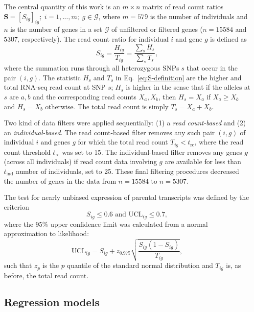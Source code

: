 \documentclass[letterpaper]{article}
\begin{document}
The central quantity of this work is an \(m\times n\) matrix of read count ratios
\(\mathbf{S} = [S_{ig}]_{ig};\; i=1,...,m; \; g\in\mathcal{G}\), where
\(m=579\) is the number of individuals and \(n\) is the number of genes
in a set \(\mathcal{G}\) of unfiltered or filtered genes (\(n=15584\) and \(5307\),
respectively).  The read count ratio for
individual \(i\) and gene \(g\) is defined as
\begin{equation}
S_{ig} = \frac{H_{ig}}{T_{ig}}= \frac{\sum_s H_s}{\sum_sT_s},
\label{eq:S-definition}
\end{equation}
where the summation runs through all heterozygous SNPs \(s\) that occur in the
pair
\((i,g)\).  The statistic \(H_s\) and \(T_s\) in Eq.~\ref{eq:S-definition} are
the higher and total RNA-seq read count at SNP \(s\); \(H_s\) is higher in the
sense that if the alleles at \(s\) are \(a,b\) and the corresponding read counts
\(X_a,X_b\), then \(H_s = X_a\) if \(X_a\ge X_b\) and \(H_s = X_b\) otherwise.
The total read count is simply \(T_s = X_a + X_b\).

Two kind of data filters were applied sequentially: (1) a \emph{read
count-based} and (2) an \emph{individual-based}.  The read count-based filter
removes any such pair $(i,g)$ of individual $i$ and genes $g$ for which the
total read count $T_{ig}<t_\mathrm{rc}$, where the read count threshold
$t_\mathrm{rc}$ was set to 15. The individual-based filter removes any genes
$g$ (across all individuals) if read count data involving $g$ are available
for less than $t_\mathrm{ind}$ number of individuals, set to 25.
These final filtering procedures decreased the number of genes in the data from
\(n=15584\) to \(n=5307\).

The test for nearly unbiased expression of parental transcripts was defined by
the criterion
\begin{equation}
S_{ig} \le 0.6 \text{ and } \mathrm{UCL}_{ig} \le 0.7,
\label{eq:unbiased-test}
\end{equation}
where the 95\% upper confidence limit was calculated from a normal approximation to
likelihood:
\begin{equation}
\mathrm{UCL}_{ig} = S_{ig} + z_{0.975} \sqrt{\frac{S_{ig} (1 - S_{ig})}{T_{ig}}},
\end{equation}
such that $z_{p}$ is the $p$ quantile of the standard normal distribution and
$T_{ig}$ is, as before, the total read count.

\subsection{Regression models}
\label{sec:methods-regression}
\end{document}
